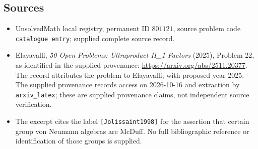 \documentclass[11pt]{article}
\begin{document}
\subsection{Sources}
\begin{itemize}
\item UnsolvedMath local registry, permanent ID \(801121\), source problem code \texttt{catalogue entry}; supplied complete source record.
\item Elayavalli, \emph{50 Open Problems: Ultraproduct II\_1 Factors} (2025), Problem 22, as identified in the supplied provenance: \url{https://arxiv.org/abs/2511.20377}. The record attributes the problem to Elayavalli, with proposed year 2025. The supplied provenance records access on 2026-10-16 and extraction by \texttt{arxiv\_latex}; these are supplied provenance claims, not independent source verification.
\item The excerpt cites the label \texttt{[Jolissaint1998]} for the assertion that certain group von Neumann algebras are McDuff. No full bibliographic reference or identification of those groups is supplied.
\end{itemize}
\end{document}
